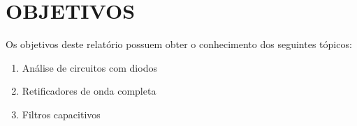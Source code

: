 \chapter{OBJETIVOS}

Os objetivos deste relatório possuem obter o conhecimento dos seguintes tópicos:

\begin{enumerate}
    \item Análise de circuitos com diodos
    \item Retificadores de onda completa
    \item Filtros capacitivos
\end{enumerate}